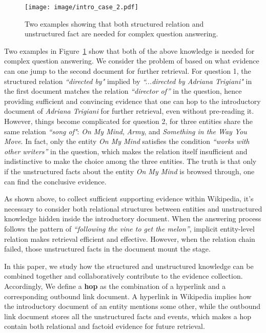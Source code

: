 \documentclass[letterpaper]{article} \usepackage{aaai21}  \usepackage{times}  \usepackage{helvet} \usepackage{courier}  \usepackage[hyphens]{url}  \usepackage{graphicx} \urlstyle{rm} \def\UrlFont{\rm}  \usepackage{graphicx}  \usepackage{natbib}  \usepackage{caption} \frenchspacing  \setlength{\pdfpagewidth}{8.5in}  \setlength{\pdfpageheight}{11in}
\begin{document}
\begin{figure}[t]
    \begin{center}
        \texttt{[image: image/intro\_case\_2.pdf]}
        \caption {Two examples showing that both structured relation and unstructured fact are needed for complex question answering.}
        \label{fig:intro}
    \end{center}
\end{figure}
  

Two examples in Figure~\ref{fig:intro} show that both of the above knowledge is needed for complex question answering. We consider the problem of based on what evidence can one jump to the second document for further retrieval. For question 1, the structured relation \textit{``directed by"} implied by \textit{``...directed by Adriana Trigiani"} in the first document matches the relation \textit{``director of''} in the question, hence providing sufficient and convincing evidence that one can hop to the introductory document of \textit{Adriana Trigiani} for further retrieval, even without pre-reading it. However, things become complicated for question 2, for three entities share the same relation \textit{``song of"}: \textit{On My Mind}, \textit{Army}, and \textit{Something in the Way You Move}. In fact, only the entity \textit{On My Mind} satisfies the condition \textit{``works with other writers''} in the question, which makes the relation itself insufficient and indistinctive to make the choice among the three entities. The truth is that only if the unstructured facts about the entity \textit{On My Mind} is browsed through, one can find the conclusive evidence.  

As shown above, to collect sufficient supporting evidence within Wikipedia, it's necessary to consider both relational structures between entities and unstructured knowledge hidden inside the introductory document. When the answering process follows the pattern of \textit{``following the vine to get the melon''}, implicit entity-level relation makes retrieval efficient and effective. However, when the relation chain failed, those unstructured facts in the document mount the stage. 

In this paper, we study how the structured and unstructured knowledge can be combined together and collaboratively contribute to the evidence collection. Accordingly, We define a \textbf{hop} as the combination of a hyperlink and a corresponding outbound link document. A hyperlink in Wikipedia implies how the introductory document of an entity mentions some other, while the outbound link document stores all the unstructured facts and events, which makes a hop contain both relational and factoid evidence for future retrieval. 
\end{document}

